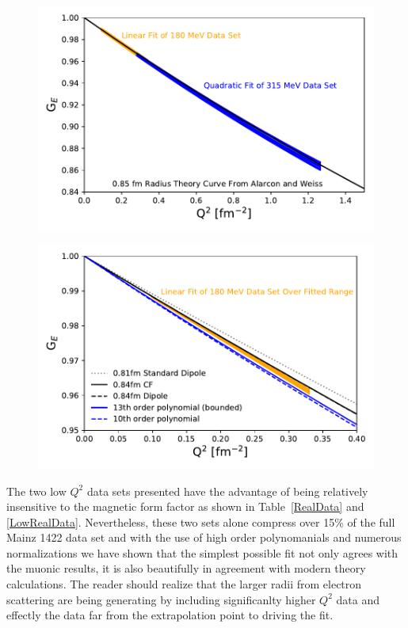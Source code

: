 \documentclass[10pt,aps,prc,twocolumn]{revtex4-1}
\begin{document}
\begin{figure}[htb]
\includegraphics[width=\columnwidth]{Figure/FitsAndTheory.pdf}
\label{FitsAndTheory}
\end{figure}

\begin{figure}[htb]
\includegraphics[width=\columnwidth]{Figure/FitsAndTheoryLowest.pdf}
\label{FitsAndTheory}
\end{figure}

The two low $Q^2$ data sets presented have the advantage of being relatively insensitive to the magnetic form 
factor as shown in Table~\ref{RealData} and \ref{LowRealData}.   Nevertheless, these two sets alone compress
over 15\% of the full Mainz 1422 data set and with the use of high order polynomanials and numerous normalizations
we have shown that the simplest possible fit not only agrees with the muonic results, it is also beautifully in
agreement with modern theory calculations.   The reader should realize that the larger radii from electron scattering
are being generating by including significanlty higher $Q^2$ data and effectly the data far from the extrapolation
point to driving the fit.
\end{document}
